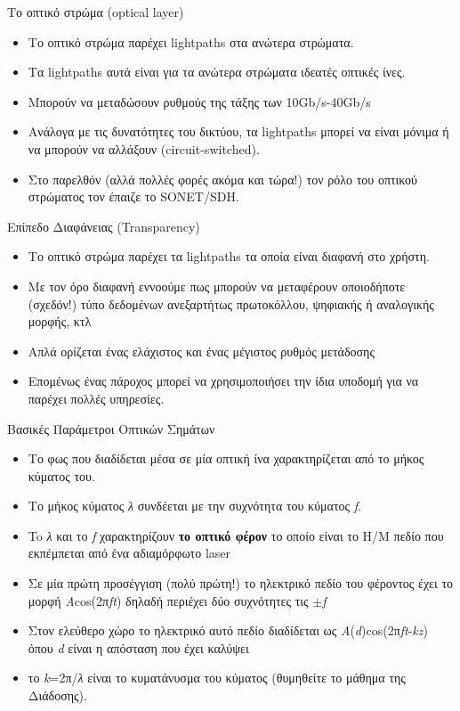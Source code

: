 \documentclass[11pt,aspectratio=169]{beamer}
\begin{document}
\begin{frame}[t]{Το οπτικό στρώμα (optical layer)}
\begin{itemize}
\item Το οπτικό στρώμα παρέχει lightpaths στα ανώτερα στρώματα.
\item Τα lightpaths αυτά είναι για τα ανώτερα στρώματα ιδεατές οπτικές ίνες.
\item Μπορούν να μεταδώσουν ρυθμούς της τάξης των 10Gb/s-40Gb/s
\item Ανάλογα με τις δυνατότητες του δικτύου, τα lightpaths μπορεί να είναι μόνιμα ή να μπορούν να αλλάξουν (circuit-switched).
\item Στο παρελθόν (αλλά πολλές φορές ακόμα και τώρα!) τον ρόλο του οπτικού στρώματος τον έπαιζε το SONET/SDH.
\end{itemize}
\end{frame}

\begin{frame}[t]{Επίπεδο Διαφάνειας (Transparency)}
\begin{itemize}
\item Το οπτικό στρώμα παρέχει τα lightpaths τα οποία είναι διαφανή στο χρήστη.
\item Με τον όρο διαφανή εννοούμε πως μπορούν να μεταφέρουν οποιοδήποτε (σχεδόν!) τύπο δεδομένων ανεξαρτήτως πρωτοκόλλου, ψηφιακής ή αναλογικής μορφής, κτλ
\item Απλά ορίζεται ένας ελάχιστος και ένας μέγιστος ρυθμός μετάδοσης
\item Επομένως ένας πάροχος μπορεί να χρησιμοποιήσει την ίδια υποδομή για να παρέχει πολλές υπηρεσίες.
\end{itemize}
\end{frame}

\begin{frame}[shrink=20,t]{Βασικές Παράμετροι Οπτικών Σημάτων}
\begin{itemize}
\item Το φως που διαδίδεται μέσα σε μία οπτική ίνα χαρακτηρίζεται από το μήκος κύματος του.
\item Το μήκος κύματος \textit{λ} συνδέεται με την συχνότητα του κύματος \textit{f}.
\item To \textit{λ} και το \textit{f} χαρακτηρίζουν \textbf{το οπτικό φέρον }το οποίο είναι το Η/Μ πεδίο που εκπέμπεται από ένα αδιαμόρφωτο laser
\item Σε μία πρώτη προσέγγιση (πολύ πρώτη!) το ηλεκτρικό πεδίο του φέροντος έχει το μορφή \textit{Α}cos(2π\textit{ft}) δηλαδή περιέχει δύο συχνότητες τις \ensuremath{\pm}\textit{f}
\item Στον ελεύθερο χώρο το ηλεκτρικό αυτό πεδίο διαδίδεται ως \textit{A}(\textit{d})cos(2π\textit{ft}-\textit{kz}) όπου \textit{d} είναι η απόσταση που έχει καλύψει
\item το \textit{k}=2π/\textit{λ }είναι το κυματάνυσμα του κύματος (θυμηθείτε το μάθημα της Διάδοσης).
\end{itemize}
\end{frame}
\end{document}
